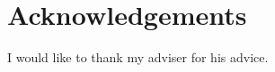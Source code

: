 ~\vfill{}

\section*{Acknowledgements}

I would like to thank my adviser for his advice.

\vspace{2.5cm}

\newpage{}
